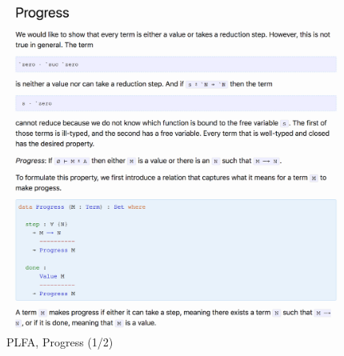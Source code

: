 \documentclass[preprint,authoryear]{elsarticle}
\begin{document}
\begin{figure}[t]
  \includegraphics[width=\textwidth]{figures/plfa-progress-1.png}
  \caption{PLFA, Progress (1/2)}
  \label{fig:plfa-progress-1}
\end{figure}  
\end{document}
